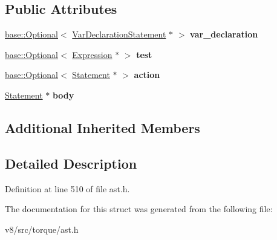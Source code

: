 \subsection*{Public Attributes}
\begin{DoxyCompactItemize}
\item 
\mbox{\label{structv8_1_1internal_1_1torque_1_1ForLoopStatement_ad4255fd20ad6408dbddfd586286ca1b2}} 
\mbox{\hyperlink{classv8_1_1base_1_1Optional}{base\+::\+Optional}}$<$ \mbox{\hyperlink{structv8_1_1internal_1_1torque_1_1VarDeclarationStatement}{Var\+Declaration\+Statement}} $\ast$ $>$ {\bfseries var\+\_\+declaration}
\item 
\mbox{\label{structv8_1_1internal_1_1torque_1_1ForLoopStatement_aec12fefdc0cef9e19cb9c99a49aa652b}} 
\mbox{\hyperlink{classv8_1_1base_1_1Optional}{base\+::\+Optional}}$<$ \mbox{\hyperlink{structv8_1_1internal_1_1torque_1_1Expression}{Expression}} $\ast$ $>$ {\bfseries test}
\item 
\mbox{\label{structv8_1_1internal_1_1torque_1_1ForLoopStatement_aa2165732e0c3b9c76dafb73b405584cf}} 
\mbox{\hyperlink{classv8_1_1base_1_1Optional}{base\+::\+Optional}}$<$ \mbox{\hyperlink{structv8_1_1internal_1_1torque_1_1Statement}{Statement}} $\ast$ $>$ {\bfseries action}
\item 
\mbox{\label{structv8_1_1internal_1_1torque_1_1ForLoopStatement_ac80055229bb34d5966f8915f65fecee8}} 
\mbox{\hyperlink{structv8_1_1internal_1_1torque_1_1Statement}{Statement}} $\ast$ {\bfseries body}
\end{DoxyCompactItemize}
\subsection*{Additional Inherited Members}


\subsection{Detailed Description}


Definition at line 510 of file ast.\+h.



The documentation for this struct was generated from the following file\+:\begin{DoxyCompactItemize}
\item 
v8/src/torque/ast.\+h\end{DoxyCompactItemize}
